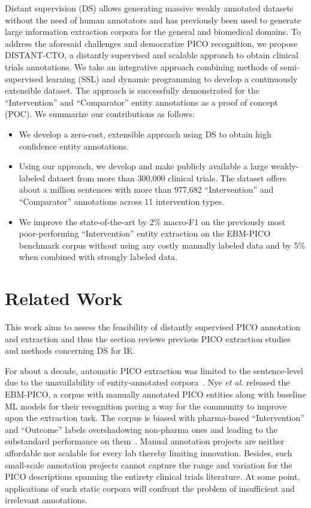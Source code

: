 \documentclass[letterpaper]{article} %
\begin{document}
Distant supervision (DS) allows generating massive weakly annotated datasets without the need of human annotators and has previously been used to generate large information extraction corpora for the general and biomedical domains.
To address the aforesaid challenges and democratize PICO recognition, we propose DISTANT-CTO, a distantly supervised and scalable approach to obtain clinical trials annotations.
We take an integrative approach combining methods of semi-supervised learning (SSL) and dynamic programming to develop a continuously extensible dataset.
The approach is successfully demonstrated for the ``Intervention'' and ``Comparator'' entity annotations as a proof of concept (POC).
We summarize our contributions as follows:
%
\begin{itemize}
    \item We develop a zero-cost, extensible approach using DS to obtain high confidence entity annotations.
    \item Using our approach, we develop and make publicly available a large weakly-labeled dataset from more than 300,000 clinical trials. The dataset offers about a million sentences with more than 977,682 ``Intervention'' and ``Comparator'' annotations across 11 intervention types.
    \item We improve the state-of-the-art by 2\% macro-F1 on the previously most poor-performing ``Intervention'' entity extraction on the EBM-PICO benchmark corpus without using any costly manually labeled data and by 5\% when combined with strongly labeled data.
\end{itemize}
%
\section{Related Work}
\label{sec:relworks}
%
This work aims to assess the feasibility of distantly supervised PICO annotation and extraction and thus the section reviews previous PICO extraction studies and methods concerning DS for IE.

For about a decade, automatic PICO extraction was limited to the sentence-level due to the unavailability of entity-annotated corpora~\citep{boudin2010combining, huang2011classification, huang2013pico, wallace2016extracting, jin2018pico}.
Nye \textit{et al.} released the EBM-PICO, a corpus with manually annotated PICO entities along with baseline ML models for their recognition paving a way for the community to improve upon the extraction task.
The corpus is biased with pharma-based ``Intervention'' and ``Outcome'' labels overshadowing non-pharma ones and leading to the substandard performance on them~\citep{nye2018corpus,beltagy2019scibert,brockmeier2019improving,zhang2020unlocking}.
Manual annotation projects are neither affordable nor scalable for every lab thereby limiting innovation.
Besides, such small-scale annotation projects cannot capture the range and variation for the PICO descriptions spanning the entirety clinical trials literature.
At some point, applications of such static corpora will confront the problem of insufficient and irrelevant annotations.
\end{document}
